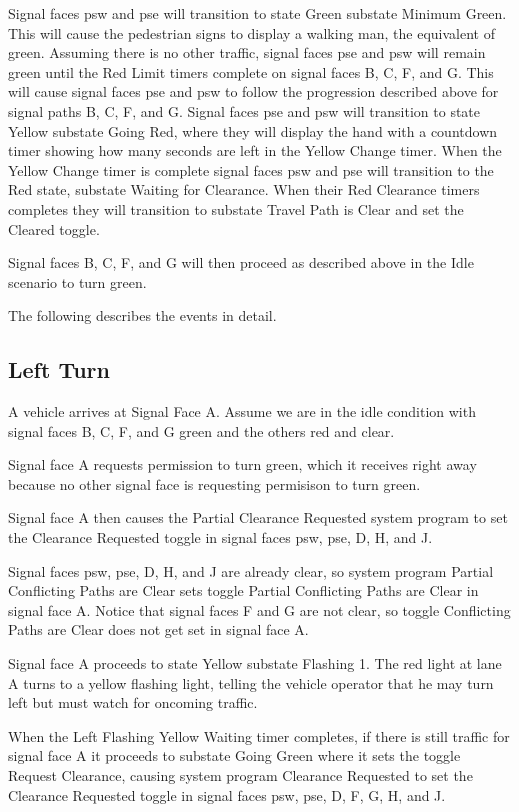 \documentclass[letterpaper,twoside]{article}
\begin{document}
Signal faces psw and pse will transition to state Green substate Minimum Green.
This will cause the pedestrian signs to display a walking man, the equivalent
of green.  Assuming there is no other traffic, signal faces pse and psw
will remain green
until the Red Limit timers complete on signal faces B, C, F, and G.
This will cause signal faces pse and psw to follow the progression described
above
for signal paths B, C, F, and G.  Signal faces pse and psw will transition
to state Yellow
substate Going Red, where they will display the hand with a countdown timer
showing how many seconds are left in the Yellow Change timer.  When the Yellow
Change timer is complete signal faces psw and pse will transition to the
Red state,
substate Waiting for Clearance.  When their Red Clearance timers completes
they will
transition to substate Travel Path is Clear and set the Cleared toggle.

Signal faces B, C, F, and G will then proceed as described above
in the Idle scenario to turn green.

The following describes the events in detail.



\subsection{Left Turn}

A vehicle arrives at Signal Face A.  Assume we are in the idle condition
with signal faces B, C, F, and G green and the others red and clear.

Signal face A requests permission to turn green, which it receives right
away because no other signal face is requesting permisison to turn green.

Signal face A then causes the Partial Clearance Requested system program
to set the Clearance Requested toggle in signal faces psw, pse, D, H, and J.

Signal faces psw, pse, D, H, and J are already clear, so system program Partial
Conflicting Paths are Clear sets toggle Partial Conflicting Paths are Clear
in signal face A.
Notice that signal faces F and G are not clear, so toggle Conflicting Paths
are Clear does not get set in signal face A.

Signal face A proceeds to state Yellow substate Flashing 1.  The red light
at lane A turns to a yellow flashing light, telling the vehicle operator
that he may turn left but must watch for oncoming traffic.

When the Left Flashing Yellow Waiting timer completes, if there is still
traffic for
signal face A it proceeds to substate Going Green where it sets the
toggle Request Clearance, causing system program Clearance Requested to
set the Clearance Requested toggle in signal faces psw, pse, D, F, G, H, and J.
\end{document}

